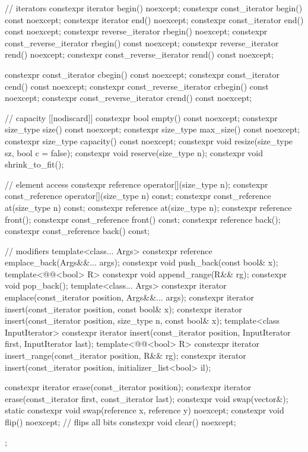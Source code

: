 \begin{codeblock}
{{    // iterators
    constexpr iterator               begin() noexcept;
    constexpr const_iterator         begin() const noexcept;
    constexpr iterator               end() noexcept;
    constexpr const_iterator         end() const noexcept;
    constexpr reverse_iterator       rbegin() noexcept;
    constexpr const_reverse_iterator rbegin() const noexcept;
    constexpr reverse_iterator       rend() noexcept;
    constexpr const_reverse_iterator rend() const noexcept;

    constexpr const_iterator         cbegin() const noexcept;
    constexpr const_iterator         cend() const noexcept;
    constexpr const_reverse_iterator crbegin() const noexcept;
    constexpr const_reverse_iterator crend() const noexcept;

    // capacity
    [[nodiscard]] constexpr bool empty() const noexcept;
    constexpr size_type size() const noexcept;
    constexpr size_type max_size() const noexcept;
    constexpr size_type capacity() const noexcept;
    constexpr void      resize(size_type sz, bool c = false);
    constexpr void      reserve(size_type n);
    constexpr void      shrink_to_fit();

    // element access
    constexpr reference       operator[](size_type n);
    constexpr const_reference operator[](size_type n) const;
    constexpr const_reference at(size_type n) const;
    constexpr reference       at(size_type n);
    constexpr reference       front();
    constexpr const_reference front() const;
    constexpr reference       back();
    constexpr const_reference back() const;

    // modifiers
    template<class... Args> constexpr reference emplace_back(Args&&... args);
    constexpr void push_back(const bool& x);
    template<@@<bool> R>
      constexpr void append_range(R&& rg);
    constexpr void pop_back();
    template<class... Args> constexpr iterator emplace(const_iterator position, Args&&... args);
    constexpr iterator insert(const_iterator position, const bool& x);
    constexpr iterator insert(const_iterator position, size_type n, const bool& x);
    template<class InputIterator>
      constexpr iterator insert(const_iterator position,
                                InputIterator first, InputIterator last);
    template<@@<bool> R>
      constexpr iterator insert_range(const_iterator position, R&& rg);
    constexpr iterator insert(const_iterator position, initializer_list<bool> il);

    constexpr iterator erase(const_iterator position);
    constexpr iterator erase(const_iterator first, const_iterator last);
    constexpr void swap(vector&);
    static constexpr void swap(reference x, reference y) noexcept;
    constexpr void flip() noexcept;     // flips all bits
    constexpr void clear() noexcept;
  };
}
\end{codeblock}%

